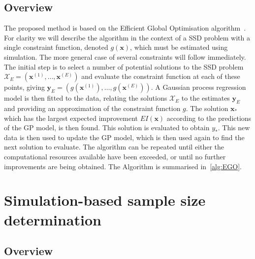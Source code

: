 \documentclass{article} %
\begin{document}
\subsection{Overview}

The proposed method is based on the Efficient Global Optimisation algorithm~\cite{Jones1998}. For clarity we will describe the algorithm in the context of a SSD problem with a single constraint function, denoted $g(\mathbf{x})$, which must be estimated using simulation. The more general case of several constraints will follow immediately. The initial step is to select a number of potential solutions to the SSD problem $\mathcal{X}_{E} = (\mathbf{x}^{(1)}, \ldots , \mathbf{x}^{(E)})$ and evaluate the constraint function at each of these points, giving $\mathbf{y}_{E} = (g(\mathbf{x}^{(1)}), \ldots , g(\mathbf{x}^{(E)}))$. A Gaussian process regression model is then fitted to the data, relating the solutions $\mathcal{X}_{E}$ to the estimates $\mathbf{y}_{E}$ and providing an approximation of the constraint function $g$. The solution $\mathbf{x}_{*}$ which has the largest expected improvement $EI(\mathbf{x})$ according to the predictions of the GP model, is then found. This solution is evaluated to obtain $y_*$. This new data is then used to update the GP model, which is then used again to find the next solution to evaluate. The algorithm can be repeated until either the computational resources available have been exceeded, or until no further improvements are being obtained. The Algorithm is summarised in~\ref{alg:EGO}.


\section{Simulation-based sample size determination}\label{sec:methods}

\subsection{Overview}
\end{document}
